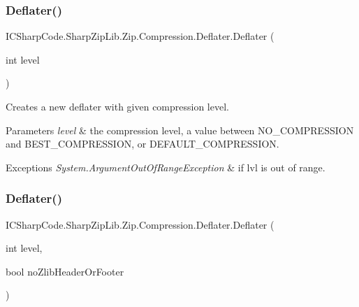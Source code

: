 \subsubsection{\texorpdfstring{Deflater()}{Deflater()}\hspace{0.1cm}{\footnotesize\ttfamily [5/6]}}
{\footnotesize\ttfamily I\+C\+Sharp\+Code.\+Sharp\+Zip\+Lib.\+Zip.\+Compression.\+Deflater.\+Deflater (\begin{DoxyParamCaption}\item[{int}]{level }\end{DoxyParamCaption})\hspace{0.3cm}{\ttfamily [inline]}}



Creates a new deflater with given compression level. 


\begin{DoxyParams}{Parameters}
{\em level} & the compression level, a value between N\+O\+\_\+\+C\+O\+M\+P\+R\+E\+S\+S\+I\+ON and B\+E\+S\+T\+\_\+\+C\+O\+M\+P\+R\+E\+S\+S\+I\+ON, or D\+E\+F\+A\+U\+L\+T\+\_\+\+C\+O\+M\+P\+R\+E\+S\+S\+I\+ON. \\
\hline
\end{DoxyParams}

\begin{DoxyExceptions}{Exceptions}
{\em System.\+Argument\+Out\+Of\+Range\+Exception} & if lvl is out of range.\\
\hline
\end{DoxyExceptions}
\mbox{\label{class_i_c_sharp_code_1_1_sharp_zip_lib_1_1_zip_1_1_compression_1_1_deflater_a8bfca90e822ab3e9984ad3287e95a61a}} 
\subsubsection{\texorpdfstring{Deflater()}{Deflater()}\hspace{0.1cm}{\footnotesize\ttfamily [6/6]}}
{\footnotesize\ttfamily I\+C\+Sharp\+Code.\+Sharp\+Zip\+Lib.\+Zip.\+Compression.\+Deflater.\+Deflater (\begin{DoxyParamCaption}\item[{int}]{level,  }\item[{bool}]{no\+Zlib\+Header\+Or\+Footer }\end{DoxyParamCaption})\hspace{0.3cm}{\ttfamily [inline]}}



